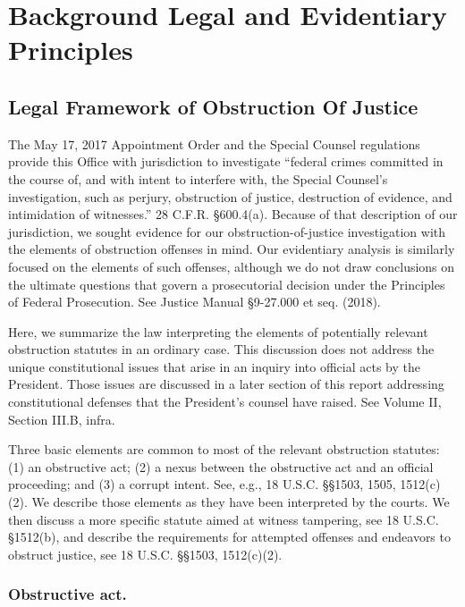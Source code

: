 \section{Background Legal and Evidentiary Principles}

\subsection{Legal Framework of Obstruction Of Justice}

The May 17, 2017 Appointment Order and the Special Counsel regulations provide this Office with jurisdiction to investigate “federal crimes committed in the course of, and with intent to interfere with, the Special Counsel's investigation, such as perjury, obstruction of justice, destruction of evidence, and intimidation of witnesses.”
28 C.F.R. \S 600.4(a). 
Because of that description of our jurisdiction, we sought evidence for our obstruction-of-justice investigation with the elements of obstruction offenses in mind. 
Our evidentiary analysis is similarly focused on the elements of such offenses, although we do not draw conclusions on the ultimate questions that govern a prosecutorial decision under the Principles of Federal Prosecution. 
See Justice Manual \S 9-27.000 et seq. (2018). 

Here, we summarize the law interpreting the elements of potentially relevant obstruction statutes in an ordinary case. 
This discussion does not address the unique constitutional issues that arise in an inquiry into official acts by the President. 
Those issues are discussed in a later section of this report addressing constitutional defenses that the President’s counsel have raised. See Volume II, Section III.B, infra. 

Three basic elements are common to most of the relevant obstruction statutes: (1) an obstructive act; (2) a nexus between the obstructive act and an official proceeding; and (3) a corrupt intent. 
See, e.g., 18 U.S.C. \S\S 1503, 1505, 1512(c)(2). 
We describe those elements as they have been interpreted by the courts. 
We then discuss a more specific statute aimed at witness tampering, see 18 U.S.C. \S 1512(b), and describe the requirements for attempted offenses and endeavors to obstruct justice, see 18 U.S.C. \S\S 1503, 1512(c)(2). 

\subsubsection*{Obstructive act.}


